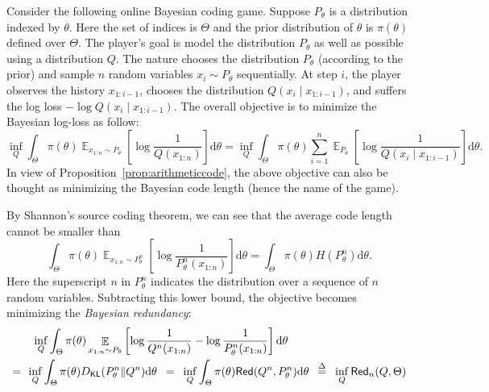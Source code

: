 \documentclass[11pt]{article}
\theoremstyle{plain}
\theoremstyle{definition}
\newcommand{\dd}{\mathrm{d}}
\newcommand{\DKL}{D_{\mathsf{KL}}}
\newcommand{\redundency}{\mathsf{Red}}
\DeclareMathOperator*{\E}{\mathbb{E}}
\begin{document}
Consider the following online Bayesian coding game.
Suppose $P_\theta$ is a distribution indexed
by $\theta$. Here the set of indices is $\Theta$ and the prior distribution of $\theta$ is $\pi(\theta)$
defined over $\Theta$.
The player's goal is model the distribution $P_\theta$
as well as possible using a distribution $Q$.
The nature chooses the distribution $P_\theta$
(according to the prior)
and sample $n$ random variables $x_i \sim P_\theta$
sequentially.
At step $i$, the player observes the history 
$x_{1:i-1}$,
chooses the distribution $Q(x_i\mid x_{1:i-1})$,
and suffers the log loss
$-\log Q(x_i\mid x_{1:i-1})$.
The overall objective is to minimize the Bayesian log-loss as follow:
$$
\inf_Q \int_\Theta \pi(\theta) \E_{x_{1:n}\sim P_\theta}
\left[\log \frac{1}{Q(x_{1:n})}\right] 
\dd \theta
=
\inf_Q \int_\Theta \pi(\theta) \sum_{i=1}^n\E_{P_\theta}
\left[\log \frac{1}{Q(x_i\mid x_{1:i-1})}\right] 
\dd \theta.
$$
In view of Proposition~\ref{prop:arithmeticcode},
the above objective can also be thought as 
minimizing the Bayesian code length (hence the name
of the game).

By Shannon's source coding theorem,
we can see that the average 
code length cannot be smaller than 
$$
\int_\Theta \pi(\theta) \E_{x_{1:n}\sim P^n_\theta}
\left[\log \frac{1}{P^n_{\theta}(x_{1:n})}\right] 
\dd \theta
=
\int_\Theta \pi(\theta) H(P^n_\theta) 
\dd \theta.
$$
Here the superscript $n$
in $P^n_\theta$ indicates the distribution over 
a sequence of $n$ random variables.
Subtracting this lower bound, the objective becomes
minimizing 
the {\em Bayesian redundancy}:
\begin{align}
& \,\,\, \inf_Q \int_\Theta \pi(\theta) \E_{x_{1:n}\sim P_\theta}
\left[\log \frac{1}{Q^n(x_{1:n})}
-\log \frac{1}{P^n_{\theta}(x_{1:n})}
\right] 
\dd \theta \notag\\
=\,\,\, &
\inf_Q\int_\Theta \pi(\theta) \DKL(P^n_\theta\| Q^n) \dd \theta
\,\,\,=\,\,\,
\inf_Q\int_\Theta \pi(\theta) \redundency(Q^n, P^n_\theta) \dd \theta
\,\,\,\overset{\Delta}{=}\,\,\,
\inf_Q\redundency_n(Q, \Theta)
\end{align}
\end{document}
